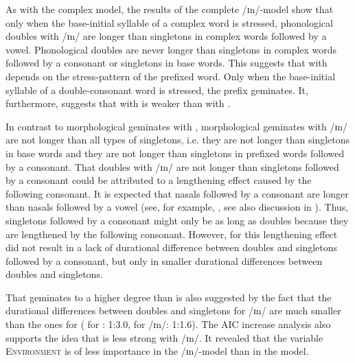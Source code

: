 As with the complex model, the results of the complete /ɪn/-model show that only when the base-initial syllable of a complex word is stressed, phonological doubles with /ɪn/ are longer than singletons in complex words followed by a vowel. 
Phonological doubles are never longer than singletons in complex words followed by a consonant or singletons in base words. 
This suggests that  with  depends on the stress-pattern of the prefixed word.  Only when the base-initial syllable of a double-consonant word is stressed, the prefix geminates. It, furthermore, suggests that  with  is weaker than  with .


In contrast to morphological geminates with ,\largerpage
morphological geminates with /ɪn/ are not longer than all types of singletons, i.e. they are not longer than singletons in base words and they are not longer than singletons in prefixed words followed by a consonant. 
That doubles with /ɪn/ are not longer than singletons followed by a consonant could be attributed to a lengthening effect caused by the following consonant.
It is expected that nasals followed by a consonant are longer than nasals followed by a vowel (see, for example, \citealt{Umeda.1977}, see also discussion in ).  Thus, singletons followed by a consonant might only be as long as doubles because they are lengthened by the following consonant. However, for  this lengthening effect did not result in a lack of durational difference between doubles and singletons followed by a consonant, but only in smaller durational differences between doubles and singletons.  

That  geminates to a higher degree than  is also suggested by the fact that the durational differences between doubles and singletons for /ɪn/ are much smaller than the ones for  ( for : 1:3.0,  for /ɪn/: 1:1.6). 
The AIC increase analysis also supports the idea that  is less strong with /ɪn/. It revealed that the variable \textsc{Environment} is of less importance in the /ɪn/-model than in the model.




